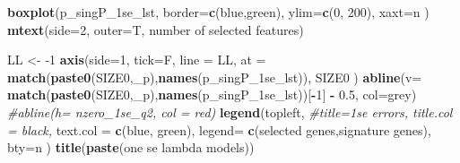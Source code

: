 \documentclass[
]{book}
\newenvironment{Shaded}{\begin{snugshade}}{\end{snugshade}}
\newcommand{\CommentTok}[1]{\textcolor[rgb]{0.56,0.35,0.01}{\textit{#1}}}
\newcommand{\DataTypeTok}[1]{\textcolor[rgb]{0.13,0.29,0.53}{#1}}
\newcommand{\DecValTok}[1]{\textcolor[rgb]{0.00,0.00,0.81}{#1}}
\newcommand{\FloatTok}[1]{\textcolor[rgb]{0.00,0.00,0.81}{#1}}
\newcommand{\KeywordTok}[1]{\textcolor[rgb]{0.13,0.29,0.53}{\textbf{#1}}}
\newcommand{\NormalTok}[1]{#1}
\newcommand{\OperatorTok}[1]{\textcolor[rgb]{0.81,0.36,0.00}{\textbf{#1}}}
\newcommand{\StringTok}[1]{\textcolor[rgb]{0.31,0.60,0.02}{#1}}
\begin{document}
\begin{Shaded}
\begin{Highlighting}[]
\KeywordTok{boxplot}\NormalTok{(p\_singP\_1se\_lst,}
  \DataTypeTok{border=}\KeywordTok{c}\NormalTok{(}\StringTok{\textquotesingle{}blue\textquotesingle{}}\NormalTok{,}\StringTok{\textquotesingle{}green\textquotesingle{}}\NormalTok{),}
  \DataTypeTok{ylim=}\KeywordTok{c}\NormalTok{(}\DecValTok{0}\NormalTok{, }\DecValTok{200}\NormalTok{),}
  \DataTypeTok{xaxt=}\StringTok{\textquotesingle{}n\textquotesingle{}}
\NormalTok{)}
\KeywordTok{mtext}\NormalTok{(}\DataTypeTok{side=}\DecValTok{2}\NormalTok{, }\DataTypeTok{outer=}\NormalTok{T,  }\StringTok{\textquotesingle{}number of selected features\textquotesingle{}}\NormalTok{)}

\NormalTok{LL <{-}}\StringTok{ }\DecValTok{{-}1}
\KeywordTok{axis}\NormalTok{(}\DataTypeTok{side=}\DecValTok{1}\NormalTok{, }\DataTypeTok{tick=}\NormalTok{F, }\DataTypeTok{line =}\NormalTok{ LL,}
  \DataTypeTok{at =} \KeywordTok{match}\NormalTok{(}\KeywordTok{paste0}\NormalTok{(SIZE0,}\StringTok{\textquotesingle{}\_p\textquotesingle{}}\NormalTok{),}\KeywordTok{names}\NormalTok{(p\_singP\_1se\_lst)),}
\NormalTok{  SIZE0}
\NormalTok{ )}
\KeywordTok{abline}\NormalTok{(}\DataTypeTok{v=} \KeywordTok{match}\NormalTok{(}\KeywordTok{paste0}\NormalTok{(SIZE0,}\StringTok{\textquotesingle{}\_p\textquotesingle{}}\NormalTok{),}\KeywordTok{names}\NormalTok{(p\_singP\_1se\_lst))[}\OperatorTok{{-}}\DecValTok{1}\NormalTok{] }\OperatorTok{{-}}\StringTok{ }\FloatTok{0.5}\NormalTok{, }\DataTypeTok{col=}\StringTok{\textquotesingle{}grey\textquotesingle{}}\NormalTok{)}
\CommentTok{\#abline(h= nzero\_1se\_q2, col = \textquotesingle{}red\textquotesingle{})}
\KeywordTok{legend}\NormalTok{(}\StringTok{\textquotesingle{}topleft\textquotesingle{}}\NormalTok{,}
   \CommentTok{\#title=\textquotesingle{}1se errors\textquotesingle{}, title.col = \textquotesingle{}black\textquotesingle{},}
   \DataTypeTok{text.col =} \KeywordTok{c}\NormalTok{(}\StringTok{\textquotesingle{}blue\textquotesingle{}}\NormalTok{, }\StringTok{\textquotesingle{}green\textquotesingle{}}\NormalTok{),}
   \DataTypeTok{legend=} \KeywordTok{c}\NormalTok{(}\StringTok{\textquotesingle{}selected genes\textquotesingle{}}\NormalTok{,}\StringTok{\textquotesingle{}signature genes\textquotesingle{}}\NormalTok{),}
   \DataTypeTok{bty=}\StringTok{\textquotesingle{}n\textquotesingle{}}
\NormalTok{ )}
\KeywordTok{title}\NormalTok{(}\KeywordTok{paste}\NormalTok{(}\StringTok{\textquotesingle{}one se lambda models\textquotesingle{}}\NormalTok{))}



\end{Highlighting}
\end{Shaded}
\end{document}
